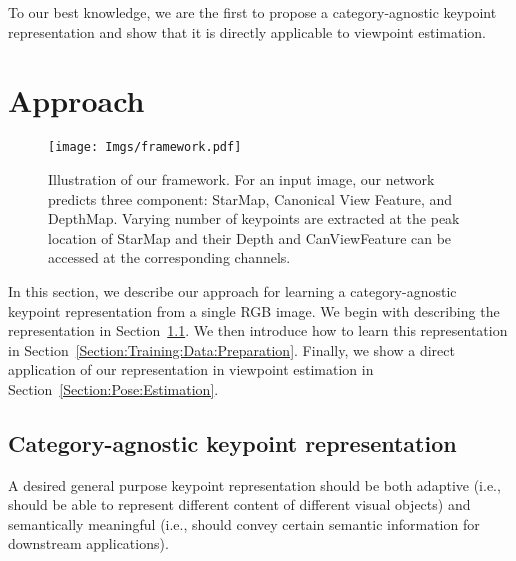 \documentclass[runningheads]{llncs}
\begin{document}
To our best knowledge, we are the first to propose a category-agnostic keypoint representation and show that it is directly applicable to viewpoint estimation. 

 \section{Approach}

\begin{figure}[t]
\centering
\texttt{[image: Imgs/framework.pdf]}
\caption{Illustration of our framework. For an input image, our network predicts three component: StarMap, Canonical View Feature, and DepthMap. Varying number of keypoints are extracted at the peak location of StarMap and their Depth and CanViewFeature can be accessed at the corresponding channels.}
\label{fig:framework}
\end{figure}


In this section, we describe our approach for learning a category-agnostic keypoint representation from a single RGB image. 
We begin with describing the representation in Section~\ref{Section:Problem:Statement}.
We then introduce how to learn this representation in Section~\ref{Section:Training:Data:Preparation}.
Finally, we show a direct application of our representation in viewpoint estimation in Section~\ref{Section:Pose:Estimation}.

\subsection{Category-agnostic keypoint representation}
\label{Section:Problem:Statement}

A desired general purpose keypoint representation should 
be both adaptive (i.e., should be able to represent different content of different visual objects) and semantically meaningful (i.e., should convey certain semantic information for downstream applications). 
\end{document}
